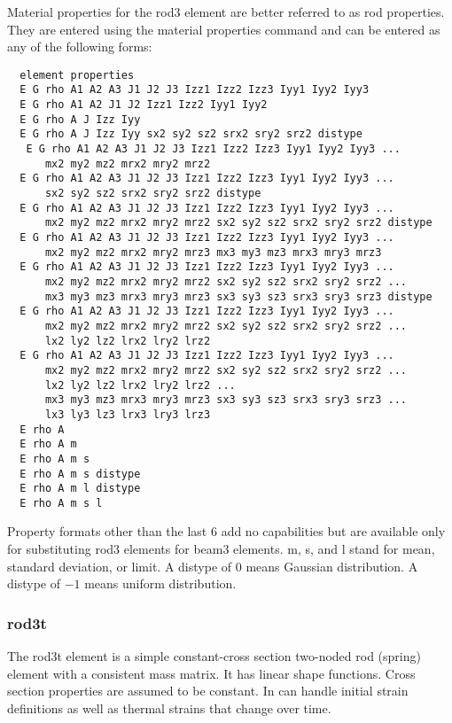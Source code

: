 \documentclass[12pt]{article}
\newcommand*{\command}[1]{\textsf{#1}}
\begin{document}
Material properties for the \command{rod3} element  are better referred to as rod
properties. They are entered using the material properties command and
can be entered as any of the following forms:
\begin{lstlisting}
  element properties
  E G rho A1 A2 A3 J1 J2 J3 Izz1 Izz2 Izz3 Iyy1 Iyy2 Iyy3 
  E G rho A1 A2 J1 J2 Izz1 Izz2 Iyy1 Iyy2 
  E G rho A J Izz Iyy 
  E G rho A J Izz Iyy sx2 sy2 sz2 srx2 sry2 srz2 distype 
   E G rho A1 A2 A3 J1 J2 J3 Izz1 Izz2 Izz3 Iyy1 Iyy2 Iyy3 ...  
      mx2 my2 mz2 mrx2 mry2 mrz2 
  E G rho A1 A2 A3 J1 J2 J3 Izz1 Izz2 Izz3 Iyy1 Iyy2 Iyy3 ...  
      sx2 sy2 sz2 srx2 sry2 srz2 distype 
  E G rho A1 A2 A3 J1 J2 J3 Izz1 Izz2 Izz3 Iyy1 Iyy2 Iyy3 ...  
      mx2 my2 mz2 mrx2 mry2 mrz2 sx2 sy2 sz2 srx2 sry2 srz2 distype 
  E G rho A1 A2 A3 J1 J2 J3 Izz1 Izz2 Izz3 Iyy1 Iyy2 Iyy3 ...
      mx2 my2 mz2 mrx2 mry2 mrz3 mx3 my3 mz3 mrx3 mry3 mrz3 
  E G rho A1 A2 A3 J1 J2 J3 Izz1 Izz2 Izz3 Iyy1 Iyy2 Iyy3 ...
      mx2 my2 mz2 mrx2 mry2 mrz2 sx2 sy2 sz2 srx2 sry2 srz2 ...  
      mx3 my3 mz3 mrx3 mry3 mrz3 sx3 sy3 sz3 srx3 sry3 srz3 distype
  E G rho A1 A2 A3 J1 J2 J3 Izz1 Izz2 Izz3 Iyy1 Iyy2 Iyy3 ...
      mx2 my2 mz2 mrx2 mry2 mrz2 sx2 sy2 sz2 srx2 sry2 srz2 ...  
      lx2 ly2 lz2 lrx2 lry2 lrz2 
  E G rho A1 A2 A3 J1 J2 J3 Izz1 Izz2 Izz3 Iyy1 Iyy2 Iyy3 ...
      mx2 my2 mz2 mrx2 mry2 mrz2 sx2 sy2 sz2 srx2 sry2 srz2 ...  
      lx2 ly2 lz2 lrx2 lry2 lrz2 ...  
      mx3 my3 mz3 mrx3 mry3 mrz3 sx3 sy3 sz3 srx3 sry3 srz3 ...
      lx3 ly3 lz3 lrx3 lry3 lrz3 
  E rho A 
  E rho A m
  E rho A m s
  E rho A m s distype
  E rho A m l distype
  E rho A m s l 
\end{lstlisting}
Property formats other than the last 6 add no capabilities but are available
only for substituting \command{rod3} elements for \command{beam3} elements. \command{m}, \command{s}, and \command{l}
stand for mean, standard deviation, or limit. A \command{distype} of $0$
means Gaussian distribution. A \command{distype} of $-1$ means uniform distribution. 

\subsubsection{\command{rod3t}}\label{el:rod3t}
The \command{rod3t} element is a simple constant-cross section two-noded rod (spring) element with a consistent mass matrix.  It has linear shape functions. Cross section properties are assumed to be constant. In can handle initial strain definitions as well as thermal strains that change over time.
\end{document}
